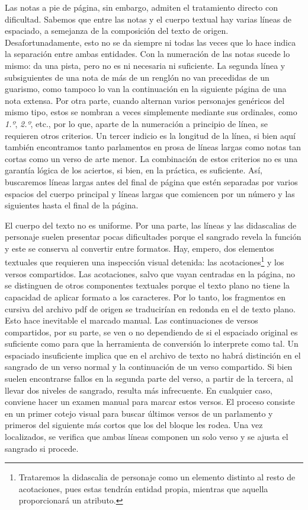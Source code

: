 Las notas a pie de página, sin embargo, admiten el tratamiento directo  con dificultad. Sabemos que entre las notas y el cuerpo textual hay varias líneas de espaciado, a semejanza de la composición del texto de origen. Desafortunadamente, esto no se da siempre ni todas las veces que lo hace indica la separación entre ambas entidades. Con la numeración de las notas sucede lo mismo: da una pista, pero no es ni necesaria ni suficiente. La segunda línea y subsiguientes de una nota de más de un renglón no van precedidas de un guarismo, como tampoco lo van la continuación en la siguiente página de una nota extensa. Por otra parte, cuando alternan varios personajes genéricos del mismo tipo, estos se nombran a veces simplemente mediante sus ordinales, como \textit{1.º}, \textit{2.º}, etc., por lo que, aparte de la numeración a principio de línea, se requieren otros criterios. Un tercer indicio es la longitud de la línea, si bien aquí también encontramos tanto parlamentos en prosa de líneas largas como notas tan cortas como un verso de arte menor. La combinación de estos criterios no es una garantía lógica de los aciertos, si bien, en la práctica, es suficiente. Así, buscaremos líneas largas antes del final de página que estén separadas por varios espacios del cuerpo principal y líneas largas que comiencen por un número y las siguientes hasta el final de la página.

El cuerpo del texto no es uniforme. Por una parte, las líneas y las didascalias de personaje suelen presentar pocas dificultades porque el sangrado revela la función y este se conserva al convertir entre formatos. Hay, empero, dos elementos textuales que requieren una inspección visual detenida: las acotaciones\footnote{Trataremos la didascalia de personaje como un elemento distinto al resto de acotaciones, pues estas tendrán entidad propia, mientras que aquella proporcionará un atributo.} y los versos compartidos. Las acotaciones, salvo que vayan centradas en la página, no se distinguen de otros componentes textuales porque el texto plano no tiene la capacidad de aplicar formato a los caracteres. Por lo tanto, los fragmentos en cursiva del archivo \ac{pdf} de origen se traducirían en redonda en el de texto plano. Esto hace inevitable el marcado manual. Las continuaciones de versos compartidos, por su parte, se ven o no dependiendo de si el espaciado original es suficiente como para que la herramienta de conversión lo interprete como tal. Un espaciado insuficiente implica que en el archivo de texto no habrá distinción en el sangrado de un verso normal y la continuación de un verso compartido. Si bien suelen encontrarse fallos en la segunda parte del verso, a partir de la tercera, al llevar dos niveles de sangrado, resulta más infrecuente. En cualquier caso, conviene hacer un examen manual para marcar estos versos. El proceso consiste en un primer cotejo visual para buscar últimos versos de un parlamento y primeros del siguiente más cortos que los del bloque les rodea. Una vez localizados, se verifica que ambas líneas componen un solo verso y se ajusta el sangrado si procede.

